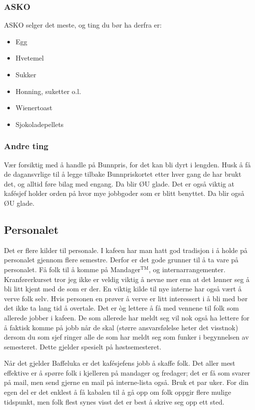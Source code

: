 \subsubsection{ASKO}
ASKO selger det meste, og ting du bør ha derfra er:
\begin{itemize}
       \item Egg
       \item Hvetemel
       \item Sukker
       \item Honning, suketter o.l.
       \item Wienertoast
       \item Sjokoladepellets
\end{itemize}


\subsubsection{Andre ting} Vær forsiktig med å handle på Bunnpris, for det kan
bli dyrt i lengden. Husk å få de dagansvrlige til å legge tilbake Bunnpriskortet
etter hver gang de har brukt det, og alltid føre bilag med engang. Da blir ØU
glade. Det er også viktig at kafésjef holder orden på hvor mye jobbgoder som er
blitt benyttet. Da blir også ØU glade.

\subsection{Personalet} Det er flere kilder til personale. I kafeen har man hatt
god tradisjon i å holde på personalet gjennom flere semestre. Derfor er det gode
grunner til å ta vare på personalet. Få folk til å komme på
Mandager$^\text{TM}$, og internarrangementer.  Kranførerkurset tror jeg ikke er
veldig viktig å nevne mer enn at det lønner seg å bli litt kjent med de som er
der. En viktig kilde til nye interne har også vært å verve folk selv. Hvis
personen en prøver å verve er litt interessert i å bli med bør det ikke ta lang
tid å overtale. Det er \`og lettere å få med vennene til folk som allerede
jobber i kafeen. De som allerede har meldt seg vil nok også ha lettere for å
faktisk komme på jobb når de skal (større ansvarsfølelse heter det visstnok)
dersom du som sjef ringer alle de som har meldt seg som funker i begynnelsen av
semesteret. Dette gjelder spesielt på høstsemesteret.

Når det gjelder Baffeluka er det kaf\'esjefens jobb å skaffe folk. Det aller
mest effektive er å spørre folk i kjelleren på mandager og fredager; det er få
som svarer på mail, men send gjerne en mail på interne-lista også. Bruk et par
uker. For din egen del er det enklest å få kabalen til å gå opp om folk oppgir
flere mulige tidspunkt, men folk flest synes visst det er best å skrive seg opp
ett sted.

